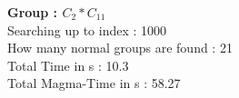 \textbf{Group : $C_2*C_{11}$}\\
Searching up to index : 1000\\
How many normal groups are found : 21\\
Total Time in s : 10.3\\
Total Magma-Time in s : 58.27\\
